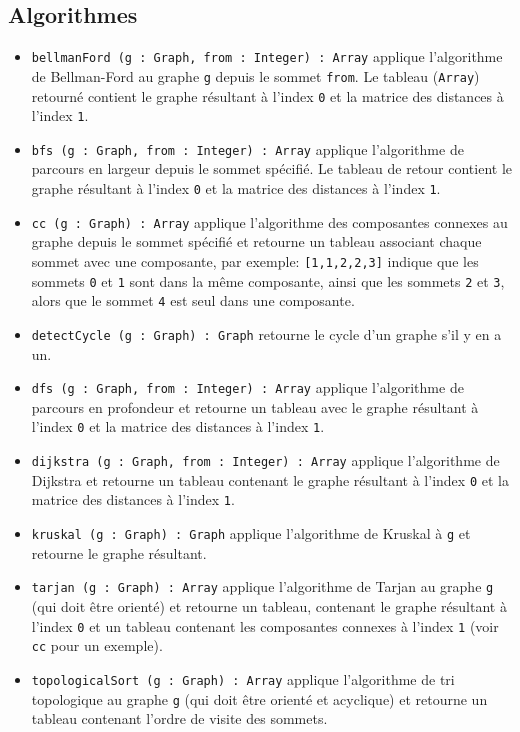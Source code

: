 \documentclass[french]{article}
\begin{document}
		\subsection{Algorithmes}
		\begin{itemize}
			\item \texttt{bellmanFord (g : Graph, from : Integer) : Array} applique l'algorithme de Bellman-Ford au graphe \texttt{g} depuis le sommet \texttt{from}. Le tableau (\texttt{Array}) retourné contient le graphe résultant à l'index \texttt{0} et la matrice des distances à l'index \texttt{1}.
			\item \texttt{bfs (g : Graph, from : Integer) : Array} applique l'algorithme de parcours en largeur depuis le sommet spécifié. Le tableau de retour contient le graphe résultant à l'index \texttt{0} et la matrice des distances à l'index \texttt{1}.
			\item \texttt{cc (g : Graph) : Array} applique l'algorithme des composantes connexes au graphe depuis le sommet spécifié et retourne un tableau associant chaque sommet avec une composante, par exemple: \texttt{[1,1,2,2,3]} indique que les sommets \texttt{0} et \texttt{1} sont dans la même composante, ainsi que les sommets \texttt{2} et \texttt{3}, alors que le sommet \texttt{4} est seul dans une composante.
			\item \texttt{detectCycle (g : Graph) : Graph} retourne le cycle d'un graphe s'il y en a un.
			\item \texttt{dfs (g : Graph, from : Integer) : Array} applique l'algorithme de parcours en profondeur et retourne un tableau avec le graphe résultant à l'index \texttt{0} et la matrice des distances à l'index \texttt{1}.
			\item \texttt{dijkstra (g : Graph, from : Integer) : Array} applique l'algorithme de Dijkstra et retourne un tableau contenant le graphe résultant à l'index \texttt{0} et la matrice des distances à l'index \texttt{1}.
			\item \texttt{kruskal (g : Graph) : Graph} applique l'algorithme de Kruskal à \texttt{g} et retourne le graphe résultant.
			\item \texttt{tarjan (g : Graph) : Array} applique l'algorithme de Tarjan au graphe \texttt{g} (qui doit être orienté) et retourne un tableau, contenant le graphe résultant à l'index \texttt{0} et un tableau contenant les composantes connexes à l'index \texttt{1} (voir \texttt{cc} pour un exemple).
			\item \texttt{topologicalSort (g : Graph) : Array} applique l'algorithme de tri topologique au graphe \texttt{g} (qui doit être orienté et acyclique) et retourne un tableau contenant l'ordre de visite des sommets.

\end{itemize}
\end{document}

